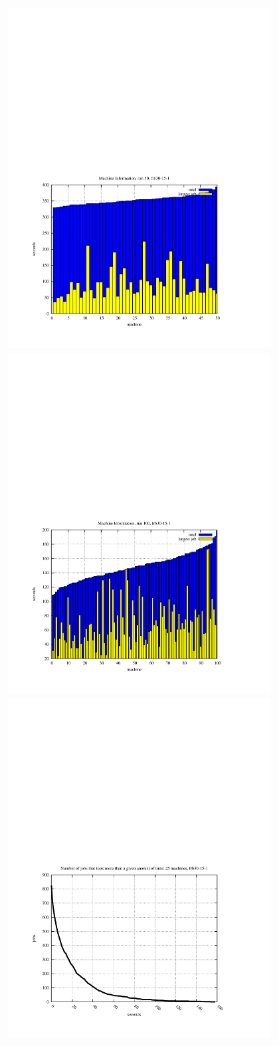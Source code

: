\documentclass{l4proj}
\begin{document}
\begin{figure}
\begin{center}
\begin{minipage}[t]{0.3\textwidth}
\includegraphics[height=9.0cm]{machInfo-run50-frb30-15-1.pdf}
\end{minipage}
\hfill
\begin{minipage}[t]{0.3\textwidth}
\includegraphics[height=9.0cm]{machInfo-run100-frb30-15-1.pdf}
\end{minipage}
\end{center}
\vspace{-4.0cm}
\begin{center}
\hspace{-1.5cm}
\begin{minipage}[t]{0.3\textwidth}
\includegraphics[height=9.0cm]{jobSizes-run25-frb30-15-1.pdf}

\end{minipage}
\end{center}
\end{figure}
\end{document}
